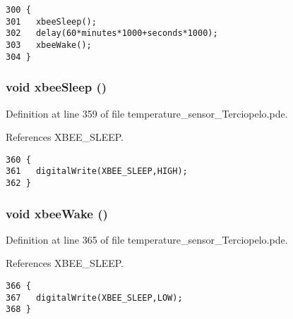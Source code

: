 \begin{Code}\begin{verbatim}300 {
301   xbeeSleep();
302   delay(60*minutes*1000+seconds*1000);
303   xbeeWake();
304 }
\end{verbatim}
\end{Code}


\hypertarget{applet_2temperature__sensor___terciopelo_8pde_a06edc5122b70b3231ff87d8234fe759}{
\subsubsection[{xbeeSleep}]{\setlength{\rightskip}{0pt plus 5cm}void xbeeSleep ()}}
\label{applet_2temperature__sensor___terciopelo_8pde_a06edc5122b70b3231ff87d8234fe759}




Definition at line 359 of file temperature\_\-sensor\_\-Terciopelo.pde.

References XBEE\_\-SLEEP.

\begin{Code}\begin{verbatim}360 {
361   digitalWrite(XBEE_SLEEP,HIGH);
362 }
\end{verbatim}
\end{Code}


\hypertarget{applet_2temperature__sensor___terciopelo_8pde_884c5dd8e3bb500063c819db197db666}{
\subsubsection[{xbeeWake}]{\setlength{\rightskip}{0pt plus 5cm}void xbeeWake ()}}
\label{applet_2temperature__sensor___terciopelo_8pde_884c5dd8e3bb500063c819db197db666}




Definition at line 365 of file temperature\_\-sensor\_\-Terciopelo.pde.

References XBEE\_\-SLEEP.

\begin{Code}\begin{verbatim}366 {
367   digitalWrite(XBEE_SLEEP,LOW);
368 }
\end{verbatim}
\end{Code}




